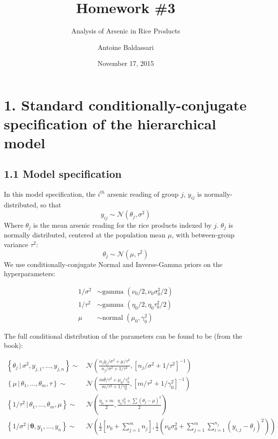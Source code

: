 \documentclass[]{article}
\title{Homework \#3}
\subtitle{Analysis of Arsenic in Rice Products}
\author{Antoine Baldassari}
\date{November 17, 2015}
\begin{document}
\maketitle


\section{1. Standard conditionally-conjugate specification of the hierarchical model}\subsection{1.1 Model specification}

In this model specification, the \(i^{th}\) arsenic reading of group
\(j\), \(y_{ij}\) is normally-distributed, so that
\[y_{ij} \sim \mathcal{N}\left( \theta_j, \sigma^2 \right)\] Where
\(\theta_j\) is the mean arsenic reading for the rice products indexed
by \(j\). \(\theta_j\) is normally distributed, centered at the
population mean \(\mu\), with between-group variance \(\tau^2\):
\[\theta_j \sim \mathcal{N}\left( \mu, \tau^2 \right) \] We use
conditionally-conjugate Normal and Inverse-Gamma priors on the
hyperparameters:

\begin{align*}
        1/\sigma^2 & \sim \text{gamma }(\nu_0/2, \nu_0\sigma^2_0/2)\\
        1/\tau^2 & \sim \text{gamma }(\eta_0/2,\eta_0\tau_0^2/2)\\
        \mu & \sim \text{normal }(\mu_0, \gamma_0^2)
    \end{align*}

The full conditional distribution of the parameters can be found to be
(from the book):

\begin{align*}
        \left\{ \theta_j \, | \, \sigma^2, y_{j,1},\ldots,y_{j,n} \right\} \sim& \, \mathcal{N}\left( \frac{n_j\bar{y}_j/\sigma^2+\mu/\tau^2}{n_j/\sigma^2 + 1/\tau^2}, \left[ n_j/\sigma^2+1/\tau^2\right]^{-1} \right) \\
        \left\{\mu \, | \, \theta_1,\ldots,\theta_m,\tau \right\} \sim& \, \mathcal{N} \left( \frac{m\bar{\theta}/\tau^2 + \mu_0/\gamma_0^2}{m/\tau^2+1/\gamma_0^2},\left[ m/\tau^2 + 1/\gamma_0^2\right]^{-1} \right)\\
        \left\{ 1/\tau^2 \, | \, \theta_1, \ldots, \theta_m, \mu \right\} \sim& \, \mathcal{N}\left( \frac{\eta_0 +m}{2},\frac{\eta_o\tau^2_0+\sum\left(\theta_j -\mu \right)^2}{2} \right) \\
        \left\{1/\sigma^2 \, | \, \boldsymbol{\theta}, y_1, \ldots, y_n \right\} \sim& \, \mathcal{N}\left( \frac{1}{2}\left[ \nu_0 + \sum\limits_{j=1}^m n_j \right], \frac{1}{2}\left(\nu_0\sigma_0^2 + \sum\limits_{j=1}^m \sum\limits_{i=1}^{n_j} \left(y_{i,j} -\theta_j \right)^2 \right)\right)
    \end{align*}
\end{document}
